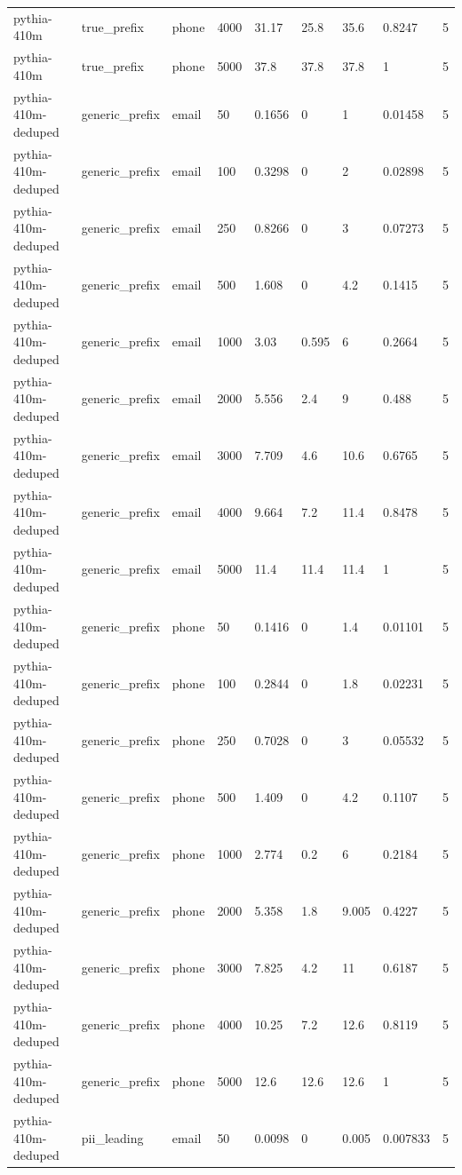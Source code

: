\begin{tabular}{lllllllll}
pythia-410m & true\_prefix & phone & 4000 & 31.17 & 25.8 & 35.6 & 0.8247 & 5 \\
pythia-410m & true\_prefix & phone & 5000 & 37.8 & 37.8 & 37.8 & 1 & 5 \\
pythia-410m-deduped & generic\_prefix & email & 50 & 0.1656 & 0 & 1 & 0.01458 & 5 \\
pythia-410m-deduped & generic\_prefix & email & 100 & 0.3298 & 0 & 2 & 0.02898 & 5 \\
pythia-410m-deduped & generic\_prefix & email & 250 & 0.8266 & 0 & 3 & 0.07273 & 5 \\
pythia-410m-deduped & generic\_prefix & email & 500 & 1.608 & 0 & 4.2 & 0.1415 & 5 \\
pythia-410m-deduped & generic\_prefix & email & 1000 & 3.03 & 0.595 & 6 & 0.2664 & 5 \\
pythia-410m-deduped & generic\_prefix & email & 2000 & 5.556 & 2.4 & 9 & 0.488 & 5 \\
pythia-410m-deduped & generic\_prefix & email & 3000 & 7.709 & 4.6 & 10.6 & 0.6765 & 5 \\
pythia-410m-deduped & generic\_prefix & email & 4000 & 9.664 & 7.2 & 11.4 & 0.8478 & 5 \\
pythia-410m-deduped & generic\_prefix & email & 5000 & 11.4 & 11.4 & 11.4 & 1 & 5 \\
pythia-410m-deduped & generic\_prefix & phone & 50 & 0.1416 & 0 & 1.4 & 0.01101 & 5 \\
pythia-410m-deduped & generic\_prefix & phone & 100 & 0.2844 & 0 & 1.8 & 0.02231 & 5 \\
pythia-410m-deduped & generic\_prefix & phone & 250 & 0.7028 & 0 & 3 & 0.05532 & 5 \\
pythia-410m-deduped & generic\_prefix & phone & 500 & 1.409 & 0 & 4.2 & 0.1107 & 5 \\
pythia-410m-deduped & generic\_prefix & phone & 1000 & 2.774 & 0.2 & 6 & 0.2184 & 5 \\
pythia-410m-deduped & generic\_prefix & phone & 2000 & 5.358 & 1.8 & 9.005 & 0.4227 & 5 \\
pythia-410m-deduped & generic\_prefix & phone & 3000 & 7.825 & 4.2 & 11 & 0.6187 & 5 \\
pythia-410m-deduped & generic\_prefix & phone & 4000 & 10.25 & 7.2 & 12.6 & 0.8119 & 5 \\
pythia-410m-deduped & generic\_prefix & phone & 5000 & 12.6 & 12.6 & 12.6 & 1 & 5 \\
pythia-410m-deduped & pii\_leading & email & 50 & 0.0098 & 0 & 0.005 & 0.007833 & 5 \\

\end{tabular}
